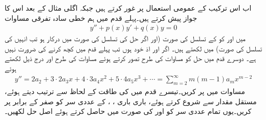 اب اس ترکیب کے عمومی استعمال پر غور کرتے ہیں جبکہ اگلی مثال کے بعد اس کا جواز پیش کرتے ہیں۔پہلے قدم میں ہم خطی سادہ تفرقی مساوات
\begin{align}\label{مساوات_بیسل_طاقتی_عمومی_مساوات_الف}
y''+p(x)y'+q(x)y=0
\end{align}
میں  اور  کو  کے تسلسل کی صورت  (اور اگر حل  کی تسلسل کی صورت میں درکار ہو تب انہیں  کی تسلسل کی صورت) میں لکھتے ہیں۔ اگر  اور  اذ خود    ہوں تب پہلے قدم میں کچھ کرنے کی ضرورت نہیں ہے۔ دوسرے قدم میں حل کو مساوات  کی طرح تصور کرتے ہوئے  مساوات  کی طرح  اور درج ذیل  لکھتے ہوئے
\begin{align}\label{مساوات_بیسل_طاقتی_تسلسل_حل_پ}
y''=2a_2+3\cdot 2 a_3x+4\cdot 3 a_4x^2+5\cdot 4 a_5 x^3+\cdots=\sum_{m=2}^{\infty} m(m-1)a_mx^{m-2}
\end{align}
مساوات  میں پر کریں۔تیسرے قدم میں  کی طاقت کے لحاظ سے ترتیب دیتے ہوئے، مستقل مقدار سے شروع کرتے ہوئے، باری باری ، ،  کے عددی سر کو صفر کے برابر پر کریں۔یوں تمام عددی سر کو  اور  کی صورت میں حاصل کرتے ہوئے اصل حل لکھیں۔

